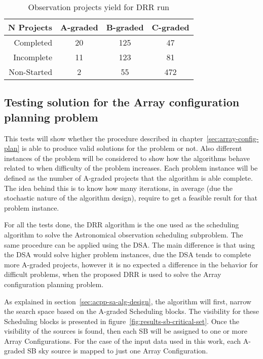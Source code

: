 \begin{table}[t!]
\centering
\begin{tabular}{|r|c|c|c|} \hline
 N Projects & A-graded & B-graded & C-graded \\ \hline
 Completed & 20 & 125 & 47 \\ \hline
 Incomplete & 11 & 123 & 81 \\ \hline
 Non-Started & 2 & 55 & 472 \\ \hline
\end{tabular}
\caption{Observation projects yield for DRR run}
\label{table:drr-run-summary}
\end{table}

\subsection{Testing solution for the Array configuration planning problem}
This tests will show whether the procedure described in chapter~\ref{sec:array-config-plan} is able to produce valid solutions for the problem or not. Also different instances of the problem will be considered to show how the algorithms behave related to when difficulty of the problem increases. Each problem instance will be defined as the number of A-graded projects that the algorithm is able complete. The idea behind this is to know how many iterations, in average (due the stochastic nature of the algorithm design), require to get a feasible result for that problem instance.

For all the tests done, the DRR algorithm is the one used as the scheduling algorithm to solve the Astronomical observation scheduling subproblem. The same procedure can be applied using the DSA. The main difference is that using the DSA would solve higher problem instances, due the DSA tends to complete more A-graded projects, however it is no expected a difference in the behavior for difficult problems, when the proposed DRR is used to solve the Array configuration planning problem.   

As explained in section~\ref{sec:acpp-sa-alg-design}, the algorithm will first, narrow the search space based on the A-graded Scheduling blocks.  The visibility for these Scheduling blocks is presented in figure~\ref{fig:results-sb-critical-set}. Once the visibility of the sources is found, then each SB will be assigned to one or more Array Configurations. For the case of the input data used in this work, each A-graded SB sky source is mapped to just one Array Configuration.

